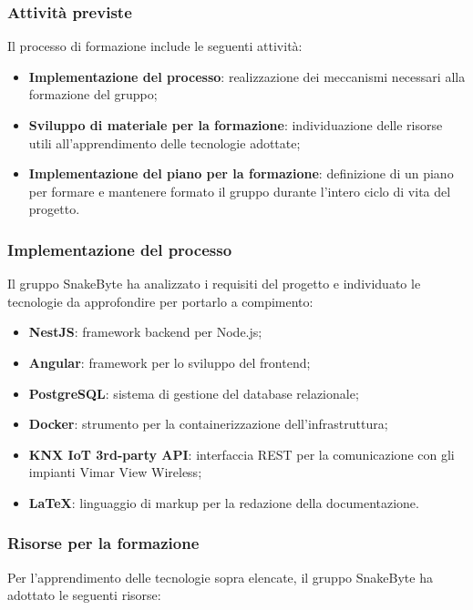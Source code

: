 \documentclass[10pt, letterpaper]{article}
\begin{document}
\subsubsection{Attività previste}
Il processo di formazione include le seguenti attività:
\begin{itemize}
    \item \textbf{Implementazione del processo}: realizzazione dei 
    meccanismi necessari alla formazione del gruppo;
    \item \textbf{Sviluppo di materiale per la formazione}: individuazione 
    delle risorse utili all'apprendimento delle tecnologie adottate;
    \item \textbf{Implementazione del piano per la formazione}: definizione 
    di un piano per formare e mantenere formato il gruppo durante 
    l'intero ciclo di vita del progetto.
\end{itemize}

\subsubsection{Implementazione del processo}
Il gruppo SnakeByte ha analizzato i requisiti del progetto e individuato 
le tecnologie da approfondire per portarlo a compimento:
\begin{itemize}
    \item \textbf{NestJS}: framework backend per Node.js;
    \item \textbf{Angular}: framework per lo sviluppo del frontend;
    \item \textbf{PostgreSQL}: sistema di gestione del database relazionale;
    \item \textbf{Docker}: strumento per la containerizzazione 
    dell'infrastruttura;
    \item \textbf{KNX IoT 3rd-party API}: interfaccia REST per la 
    comunicazione con gli impianti Vimar View Wireless;
    \item \textbf{\LaTeX}: linguaggio di markup per la redazione 
    della documentazione.
\end{itemize}

\subsubsection{Risorse per la formazione}
Per l'apprendimento delle tecnologie sopra elencate, il gruppo SnakeByte 
ha adottato le seguenti risorse:
\end{document}
